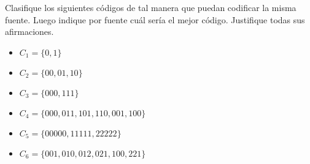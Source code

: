 
Clasifique los siguientes códigos de tal manera que puedan codificar la misma fuente. Luego indique por fuente cuál sería el mejor código. Justifique todas sus afirmaciones.
\begin{itemize}
\item $C_1=\{0,1\}$
\item $C_2=\{00,01,10\}$
\item $C_3=\{000,111\}$
\item $C_4=\{000,011,101,110,001,100\}$
\item $C_5=\{00000,11111,22222\}$
\item $C_6=\{001,010,012,021,100,221\}$
\end{itemize}
\begin{sol}
    
\end{sol}